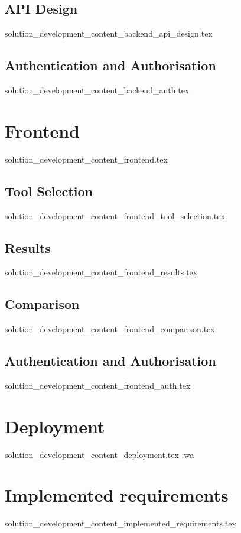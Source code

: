 \subsection{API Design}
  {solution_development_content_backend_api_design.tex}
\subsection{Authentication and Authorisation}\label{sub:backend_auth}
  {solution_development_content_backend_auth.tex}

\section{Frontend}\label{sub:frontend}
  {solution_development_content_frontend.tex}
\subsection{Tool Selection}\label{sub:frontend_tool_selection}
  {solution_development_content_frontend_tool_selection.tex}
\subsection{Results}\label{sub:frontend_results}
  {solution_development_content_frontend_results.tex}
\subsection{Comparison}\label{sub:frontend_comparison}
  {solution_development_content_frontend_comparison.tex}
\subsection{Authentication and Authorisation}\label{sub:frontend_auth}
  {solution_development_content_frontend_auth.tex}

\section{Deployment}
  {solution_development_content_deployment.tex}
  :wa


\section{Implemented requirements}
  {solution_development_content_implemented_requirements.tex}
